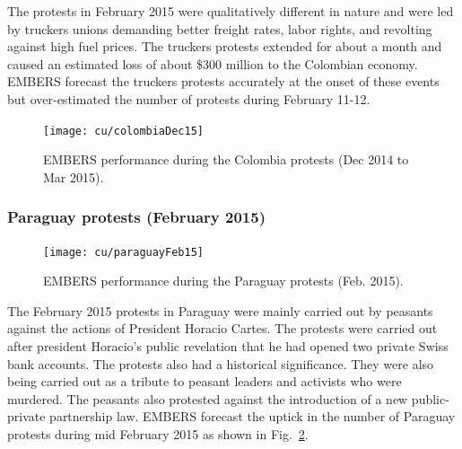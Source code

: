 The protests in February 2015 were qualitatively different in nature and
were led by truckers unions demanding better freight rates, labor rights, 
and revolting against high fuel prices.
The truckers protests extended for about a month and caused an
estimated loss of about \$300 million to the Colombian economy.
EMBERS forecast the truckers protests accurately at the onset of these
events but over-estimated the number of protests during
February 11-12.

\begin{figure} %
\centering
\texttt{[image: cu/colombiaDec15]}
\caption{EMBERS performance during the Colombia protests (Dec 2014 to Mar 2015).}
\label{fig:colombiaDec14}
\end{figure}

\subsubsection*{Paraguay protests (February 2015)}
\begin{figure} %
\centering
\texttt{[image: cu/paraguayFeb15]}
\caption{EMBERS performance during the Paraguay protests (Feb. 2015).}
\label{fig:paraguay15}
\end{figure}

The February 2015 protests in Paraguay were mainly carried out by peasants
against the actions of President Horacio Cartes.
The protests were carried out after
president Horacio's public revelation that he had opened two private Swiss bank accounts.
The protests also had a historical significance. They were 
also being carried out as a tribute
to peasant leaders and activists who were murdered. The peasants also protested
against the introduction of a new public-private partnership law.
EMBERS forecast the uptick in the
number of Paraguay protests during mid
February 2015 as shown in Fig.~\ref{fig:paraguay15}.




